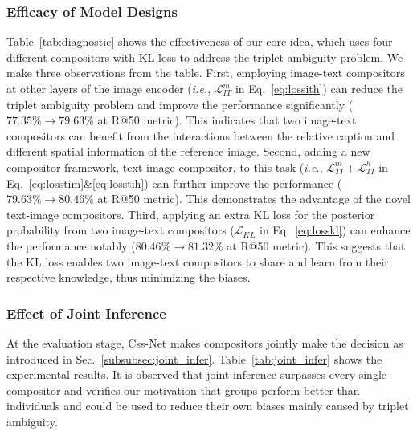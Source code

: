 \documentclass[sigconf]{acmart}
\def\ie{\emph{i.e.}}
\begin{document}
\subsubsection{Efficacy of Model Designs}

Table~\ref{tab:diagnostic} shows the effectiveness of our core idea, which uses four different compositors with KL loss to address the triplet ambiguity problem. We make three observations from the table. First, employing image-text compositors at other layers of the image encoder (\ie, $\mathcal{L}_{IT}^m$ in Eq.~\ref{eq:lossith}) can reduce the triplet ambiguity problem and improve the performance significantly ($77.35\% \rightarrow 79.63\%$ at R@50 metric). This indicates that two image-text compositors can benefit from the interactions between the relative caption and different spatial information of the reference image. Second, adding a new compositor framework, text-image compositor, to this task (\ie, $\mathcal{L}_{TI}^m+\mathcal{L}_{TI}^h$ in Eq.~\ref{eq:losstim}\&\ref{eq:losstih}) can further improve the performance ($79.63\% \rightarrow 80.46\%$ at R@50 metric). This demonstrates the advantage of the novel text-image compositors. Third, applying an extra KL loss for the posterior probability from two image-text compositors ($\mathcal{L}_{KL}$ in Eq.~\ref{eq:losskl})  can enhance the performance notably ($80.46\% \rightarrow 81.32\%$ at R@50 metric). This suggests that the KL loss enables two image-text compositors to share and learn from their respective knowledge, thus minimizing the biases.

\subsubsection{Effect of Joint Inference}

At the evaluation stage, Css-Net makes compositors jointly make the decision as introduced in Sec.~\ref{subsubsec:joint_infer}. Table~\ref{tab:joint_infer} shows the experimental results. It is observed that joint inference surpasses every single compositor and verifies our motivation that groups perform better than individuals and could be used to reduce their own biases mainly caused by triplet ambiguity. 
\end{document}
